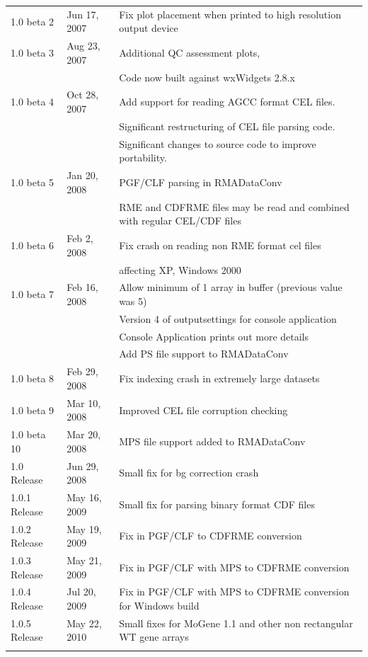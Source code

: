 \documentclass[11pt]{report}
\begin{document}
{\begin{tabular}{lll}
1.0 beta 2 & Jun 17, 2007 & Fix plot placement when printed to high resolution output device \\
1.0 beta 3 & Aug 23, 2007 & Additional QC assessment plots,  \\
& & Code now built against wxWidgets 2.8.x \\
1.0 beta 4 & Oct 28, 2007 & Add support for reading AGCC format CEL files. \\
& & Significant restructuring of CEL file parsing code. \\
& & Significant changes to source code to improve portability. \\
1.0 beta 5 & Jan 20, 2008 & PGF/CLF parsing in RMADataConv \\
& & RME and CDFRME files may be read and combined with regular CEL/CDF files \\
1.0 beta 6 & Feb 2, 2008 & Fix crash on reading non RME format cel files \\
& & affecting XP, Windows 2000 \\
1.0 beta 7 & Feb 16, 2008 & Allow minimum of 1 array in buffer (previous value was 5) \\
& & Version 4 of outputsettings for console application \\
& & Console Application prints out more details \\
& & Add PS file support to RMADataConv \\
1.0 beta 8 & Feb 29, 2008 & Fix indexing crash in extremely large datasets \\
1.0 beta 9 & Mar 10, 2008 & Improved CEL file corruption checking \\ 
1.0 beta 10 & Mar 20, 2008 & MPS file support added to RMADataConv \\
1.0 Release & Jun 29, 2008 & Small fix for bg correction crash \\
1.0.1 Release & May 16, 2009 & Small fix for parsing binary format CDF files \\
1.0.2 Release & May 19, 2009 & Fix in PGF/CLF to CDFRME conversion \\
1.0.3 Release & May 21, 2009 & Fix in PGF/CLF with MPS to CDFRME conversion \\
1.0.4 Release & Jul 20, 2009 & Fix in PGF/CLF with MPS to CDFRME conversion for Windows build \\
1.0.5 Release & May 22, 2010 & Small fixes for MoGene 1.1 and other non rectangular WT gene arrays \\
\\\hline
\end{tabular}
}
\end{document}
